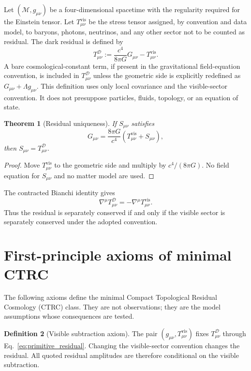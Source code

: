 \documentclass[
  aps,
  prd,
  reprint,
  superscriptaddress,
  floatfix,
  nofootinbib,
  longbibliography
]{revtex4-2}
\theoremstyle{plain}
\newtheorem{theorem}{Theorem}
\theoremstyle{definition}
\newtheorem{definition}[theorem]{Definition}
\theoremstyle{remark}
\newcommand{\D}{\mathcal D}
\newcommand{\M}{\mathcal M}
\newcommand{\vis}{\mathrm{vis}}
\begin{document}
Let \((\M,g_{\mu\nu})\) be a four-dimensional spacetime with the regularity required for the Einstein tensor.  Let \(T^{\vis}_{\mu\nu}\) be the stress tensor assigned, by convention and data model, to baryons, photons, neutrinos, and any other sector not to be counted as residual.  The dark residual is defined by
\begin{equation}
\boxed{
T^\D_{\mu\nu}:=
\frac{c^4}{8\pi G}G_{\mu\nu}-T^{\vis}_{\mu\nu}.
}
\label{eq:primitive_residual}
\end{equation}
A bare cosmological-constant term, if present in the gravitational field-equation convention, is included in \(T^\D_{\mu\nu}\) unless the geometric side is explicitly redefined as \(G_{\mu\nu}+\Lambda g_{\mu\nu}\).  This definition uses only local covariance and the visible-sector convention.  It does not presuppose particles, fluids, topology, or an equation of state.

\begin{theorem}[Residual uniqueness]
If \(S_{\mu\nu}\) satisfies
\begin{equation}
G_{\mu\nu}=\frac{8\pi G}{c^4}\left(T^{\vis}_{\mu\nu}+S_{\mu\nu}\right),
\label{eq:residual_uniqueness_assumption}
\end{equation}
then \(S_{\mu\nu}=T^\D_{\mu\nu}\).
\end{theorem}

\begin{proof}
Move \(T^{\vis}_{\mu\nu}\) to the geometric side and multiply by \(c^4/(8\pi G)\).  No field equation for \(S_{\mu\nu}\) and no matter model are used.
\end{proof}

The contracted Bianchi identity gives
\begin{equation}
\nabla^\mu T^\D_{\mu\nu}=-\nabla^\mu T^{\vis}_{\mu\nu}.
\label{eq:residual_conservation_general}
\end{equation}
Thus the residual is separately conserved if and only if the visible sector is separately conserved under the adopted convention.

\section{First-principle axioms of minimal CTRC}

The following axioms define the minimal Compact Topological Residual Cosmology (CTRC) class.  They are not observations; they are the model assumptions whose consequences are tested.

\begin{definition}[Visible subtraction axiom]
The pair \((g_{\mu\nu},T^{\vis}_{\mu\nu})\) fixes \(T^\D_{\mu\nu}\) through Eq.~\eqref{eq:primitive_residual}.  Changing the visible-sector convention changes the residual.  All quoted residual amplitudes are therefore conditional on the visible subtraction.
\end{definition}
\end{document}
